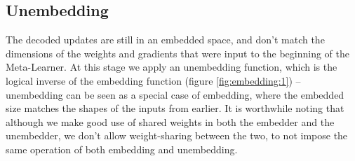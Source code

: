 \documentclass{report}
\begin{document}
\subsection{Unembedding}
The decoded updates are still in an embedded space, and don't match the dimensions of the weights and gradients that were input to the beginning of the Meta-Learner. At this stage we apply an unembedding function, which is the logical inverse of the embedding function (figure \ref{fig:embedding:1}) -- unembedding can be seen as a special case of embedding, where the embedded size matches the shapes of the inputs from earlier. It is worthwhile noting that although we make good use of shared weights in both the embedder and the unembedder, we don't allow weight-sharing between the two, to not impose the same operation of both embedding and unembedding.
\end{document}
